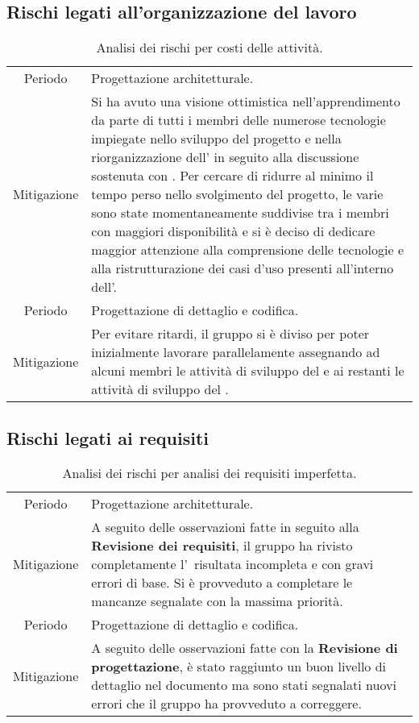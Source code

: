 \subsection{Rischi legati all'organizzazione del lavoro}
\begin{table}[H]
	\centering
	\begin{tabular}{|c|p{11.5cm}|}
		\rowcolor{darkblue} \hline
		\multicolumn{2}{|c|}{\textcolor{white}{\textbf{RO1 - Costi delle attività}}}\\ \hline
		Periodo & Progettazione architetturale.\\ \hline
		Mitigazione & Si ha avuto una visione ottimistica nell'apprendimento da parte di tutti i membri delle numerose tecnologie impiegate nello sviluppo del progetto e nella riorganizzazione dell'\AdR{} in seguito alla discussione sostenuta con \CR{}. Per cercare di ridurre al minimo il tempo perso nello svolgimento del progetto, le varie \glo{attività} sono state momentaneamente suddivise tra i membri con maggiori disponibilità e si è deciso di dedicare maggior attenzione alla comprensione delle tecnologie e alla ristrutturazione dei casi d'uso presenti all'interno dell'\AdR{}.\\ \hline
		Periodo & Progettazione di dettaglio e codifica.\\ \hline
		Mitigazione & Per evitare ritardi, il gruppo si è diviso per poter inizialmente lavorare parallelamente assegnando ad alcuni membri le attività di sviluppo del \glo{front end} e ai restanti le attività di sviluppo del \glo{back end}.\\ \hline
	\end{tabular}
	\caption{\label{tab:ARO1}Analisi dei rischi per costi delle attività.}
\end{table}

\subsection{Rischi legati ai requisiti}
\begin{table}[H]
	\centering
	\begin{tabular}{|c|p{11.5cm}|}
		\rowcolor{darkblue} \hline
		\multicolumn{2}{|c|}{\textcolor{white}{\textbf{RR1 - Analisi dei requisiti imperfetta}}}\\ \hline
		Periodo & Progettazione architetturale.\\ \hline
		Mitigazione & A seguito delle osservazioni fatte in seguito alla \textbf{Revisione dei requisiti}, il gruppo {\Gruppo} ha rivisto completamente l'\AdR\ risultata incompleta e con gravi errori di base. Si è provveduto a completare le mancanze segnalate con la massima priorità.\\ \hline
		Periodo & Progettazione di dettaglio e codifica.\\ \hline
		Mitigazione & A seguito delle osservazioni fatte con la \textbf{Revisione di progettazione}, è stato raggiunto un buon livello di dettaglio nel documento ma sono stati segnalati nuovi errori che il gruppo ha provveduto a correggere.\\ \hline
	\end{tabular}
	\caption{\label{tab:ARR1}Analisi dei rischi per analisi dei requisiti imperfetta.}
\end{table}